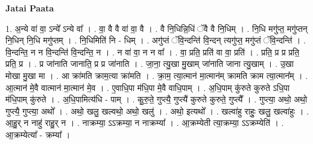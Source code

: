 \documentclass[17pt]{extarticle}
\begin{document}
\textbf{Jatai Paata} \newline

1. अ॒न्ये वा॑ वा॒ ऽन्ये᳚ ऽन्ये वा᳚ । . वा॒ वै वै वा॑ वा॒ वै । . वै नि॒धिन्नि॒धिं ॅवै वै नि॒धिम् । . नि॒धि मगु॑प्त॒ मगु॑प्तन् नि॒धिन् नि॒धि मगु॑प्तम् । . नि॒धिमिति॑ नि - धिम् । . अगु॑प्तं ॅवि॒न्दन्ति॑ वि॒न्दन् त्यगु॑प्त॒ मगु॑प्तं ॅवि॒न्दन्ति॑ । . वि॒न्दन्ति॒ न न वि॒न्दन्ति॑ वि॒न्दन्ति॒ न । . न वा॑ वा॒ न न वा᳚ । . वा॒ प्रति॒ प्रति॑ वा वा॒ प्रति॑ । . प्रति॒ प्र प्र प्रति॒ प्रति॒ प्र । . प्र जा॑नाति जानाति॒ प्र प्र जा॑नाति । . जा॒ना॒ त्यु॒खा मु॒खाम् जा॑नाति जाना त्यु॒खाम् । . उ॒खा मोखा मु॒खा मा । . आ क्रा॑मति क्राम॒त्या क्रा॑मति । . क्रा॒म॒ त्या॒त्मान॑ मा॒त्मान॑म् क्रामति क्राम त्या॒त्मान᳚म् । . आ॒त्मान॑ मे॒वै वात्मान॑ मा॒त्मान॑ मे॒व । . ए॒वाधि॒पा म॑धि॒पा मे॒वै वाधि॒पाम् । . अ॒धि॒पाम् कु॑रुते कुरुते ऽधि॒पा म॑धि॒पाम् कु॑रुते । . अ॒धि॒पामित्य॑धि - पाम् । . कु॒रु॒ते॒ गुप्त्यै॒ गुप्त्यै॑ कुरुते कुरुते॒ गुप्त्यै᳚ । . गुप्त्या॒ अथो॒ अथो॒ गुप्त्यै॒ गुप्त्या॒ अथो᳚ । . अथो॒ खलु॒ खल्वथो॒ अथो॒ खलु॑ । . अथो॒ इत्यथो᳚ । . खल्वा॑हु राहुः॒ खलु॒ खल्वा॑हुः । . आ॒हु॒र् न नाहु॑ राहु॒र् न । . नाक्रम्या॒ ऽऽक्रम्या॒ न नाक्रम्या᳚ । . आ॒क्रम्येती त्या॒क्रम्या॒ ऽऽक्रम्येति॑ । . आ॒क्रम्येत्या᳚ - क्रम्या᳚ । \newline
\end{document}
